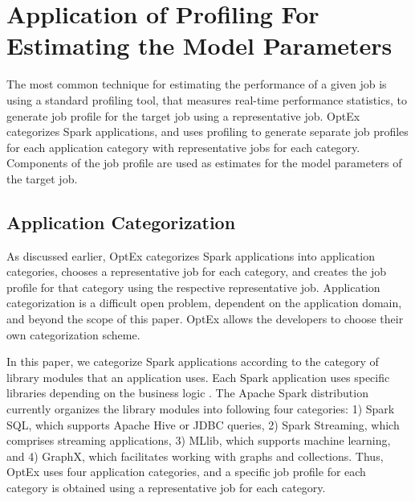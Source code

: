 \documentclass[conference]{IEEEtran}
\begin{document}
\section{Application of Profiling For Estimating the Model Parameters} \label{sec:profile}

The most common technique for estimating the performance of a given job \cite{Verma:2011:AAR:1998582.1998637,brebner2011} is using a standard profiling tool, that measures real-time performance statistics, to generate job
 profile for the target job using a representative
job. OptEx categorizes Spark applications,
 and uses profiling to
 generate separate job profiles for each application category with representative jobs for each category.
   Components of the job
 profile are used as estimates for the model parameters of the target job. 
 \subsection{Application Categorization}\label{sec:cat} As discussed earlier, OptEx categorizes Spark applications into application categories, chooses a representative
   job for each category, and creates the job profile for that category using the respective representative job.
    Application categorization is a difficult open problem, dependent on the application domain, and beyond
    the scope of this paper. OptEx allows the developers to choose their own
    categorization scheme.  \par In this paper, we categorize Spark applications
   according to the category of library modules that an application uses. Each Spark application uses specific libraries depending on the business logic \cite{Zaharia:2012:RDD:2228298.2228301}. The Apache Spark distribution \cite{apache:library1234}
   currently organizes the library modules into following four categories: 1) Spark SQL, which supports Apache Hive or JDBC queries, 2) Spark Streaming, which comprises streaming applications, 3) MLlib, which supports machine
     learning, and 4) GraphX, which facilitates working with graphs and collections. Thus, OptEx uses four application
      categories, and a specific job profile for each category is obtained using a representative job for each
      category.
\end{document}
